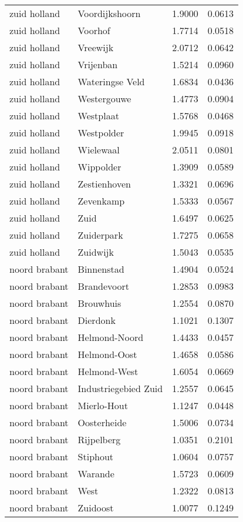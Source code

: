 \begin{longtable}{llcc}
zuid holland & Voordijkshoorn & 1.9000 & 0.0613 \\
zuid holland & Voorhof & 1.7714 & 0.0518 \\
zuid holland & Vreewijk & 2.0712 & 0.0642 \\
zuid holland & Vrijenban & 1.5214 & 0.0960 \\
zuid holland & Wateringse Veld & 1.6834 & 0.0436 \\
zuid holland & Westergouwe & 1.4773 & 0.0904 \\
zuid holland & Westplaat & 1.5768 & 0.0468 \\
zuid holland & Westpolder & 1.9945 & 0.0918 \\
zuid holland & Wielewaal & 2.0511 & 0.0801 \\
zuid holland & Wippolder & 1.3909 & 0.0589 \\
zuid holland & Zestienhoven & 1.3321 & 0.0696 \\
zuid holland & Zevenkamp & 1.5333 & 0.0567 \\
zuid holland & Zuid & 1.6497 & 0.0625 \\
zuid holland & Zuiderpark & 1.7275 & 0.0658 \\
zuid holland & Zuidwijk & 1.5043 & 0.0535 \\
noord brabant & Binnenstad & 1.4904 & 0.0524 \\
noord brabant & Brandevoort & 1.2853 & 0.0983 \\
noord brabant & Brouwhuis & 1.2554 & 0.0870 \\
noord brabant & Dierdonk & 1.1021 & 0.1307 \\
noord brabant & Helmond-Noord & 1.4433 & 0.0457 \\
noord brabant & Helmond-Oost & 1.4658 & 0.0586 \\
noord brabant & Helmond-West & 1.6054 & 0.0669 \\
noord brabant & Industriegebied Zuid & 1.2557 & 0.0645 \\
noord brabant & Mierlo-Hout & 1.1247 & 0.0448 \\
noord brabant & Oosterheide & 1.5006 & 0.0734 \\
noord brabant & Rijpelberg & 1.0351 & 0.2101 \\
noord brabant & Stiphout & 1.0604 & 0.0757 \\
noord brabant & Warande & 1.5723 & 0.0609 \\
noord brabant & West & 1.2322 & 0.0813 \\
noord brabant & Zuidoost & 1.0077 & 0.1249 \\

\end{longtable}
